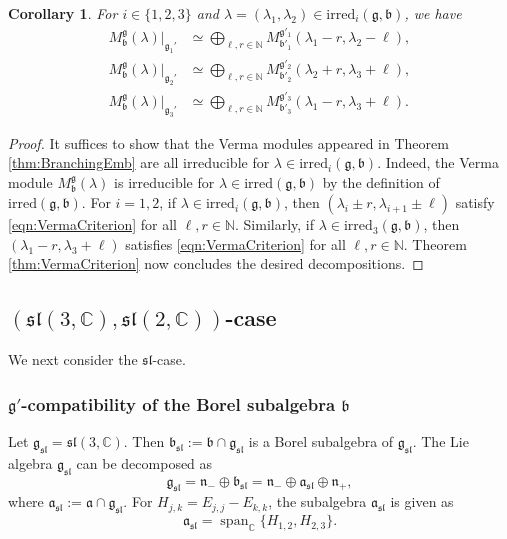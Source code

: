 \documentclass[a4paper,11pt,reqno]{amsart}
\newcommand{\fraka}{\mathfrak{a}}
\newcommand{\frakg}{\mathfrak{g}}
\newcommand{\frakn}{\mathfrak{n}}
\newcommand{\CC}{\mathbb{C}}
\newcommand{\0}{{\bf 0}}
\newcommand{\N}{\mathbb{N}}
\newcommand{\C}{\mathbb{C}}
\newcommand{\1}{{\bf 1}}
\DeclareMathOperator{\Span}{span}
\newcommand{\frakb}{{\mathfrak b}}
\newcommand{\irred}{\mathrm{irred}}
\newcommand{\fraksl}{{\mathfrak{sl}}}
\newcommand{\Mb}{M^{\frakg}_{\frakb}}
\theoremstyle{plain}
\newtheorem{corollary}[equation]{Corollary}
\theoremstyle{definition}
\numberwithin{equation}{section}
\theoremstyle{definition}
\begin{document}
\begin{corollary}\label{cor:BranchingEmb}
For $i \in \{1,2,3\}$ and 
$\lambda=(\lambda_1, \lambda_2) \in \irred_{i}(\frakg,\frakb)$,
we have
\begin{align*}
\Mb(\lambda)\vert_{\frakg_1'}
&\simeq 
\bigoplus_{\ell, r \in \N}
M^{\frakg'_1}_{\frakb'_1}(\lambda_1-r, \lambda_2-\ell),\\[3pt]
\Mb(\lambda)\vert_{\frakg_2'}
&\simeq 
\bigoplus_{\ell, r \in \N}
M^{\frakg'_2}_{\frakb'_2}(\lambda_2+r, \lambda_3+\ell),\\[3pt]
\Mb(\lambda)\vert_{\frakg_3'}
&\simeq 
\bigoplus_{\ell, r \in \N}
M^{\frakg'_3}_{\frakb'_3}(\lambda_1-r, \lambda_3+\ell).
\end{align*}
\end{corollary}

\begin{proof}
It suffices to show that the Verma modules appeared 
in Theorem \ref{thm:BranchingEmb}
are all irreducible for $\lambda \in \irred_{i}(\frakg,\frakb)$.
Indeed, the Verma module $\Mb(\lambda)$ is irreducible 
for  $\lambda \in \irred(\frakg,\frakb)$ by the definition of $\irred(\frakg,\frakb)$.
For $i=1,2$,
if $\lambda \in \irred_{i}(\frakg,\frakb)$, then 
$(\lambda_i\pm r, \lambda_{i+1}\pm \ell)$ 
satisfy \eqref{eqn:VermaCriterion} for all $\ell,r \in \N$.
Similarly, if $\lambda \in \irred_{3}(\frakg,\frakb)$, then 
$(\lambda_1-r,\lambda_3+\ell)$ satisfies \eqref{eqn:VermaCriterion}
for all $\ell, r\in \N$.
Theorem \ref{thm:VermaCriterion} now concludes the desired decompositions.
\end{proof}


\subsection{\texorpdfstring{$(\mathfrak{sl}(3,\C), \mathfrak{sl}(2,\C))$}{(gl(3,C),gl(2,C))}-case}
\label{sec:slsl}

We next consider the $\fraksl$-case.

\subsubsection{\texorpdfstring{$\frakg'$}{g}-compatibility of the Borel subalgebra \texorpdfstring{$\frakb$}{b}}
\label{sec:BorelSL}

Let $\frakg_{\fraksl}=\fraksl(3,\CC)$. Then $\frakb_{\mathfrak{sl}} := \frakb \cap \frakg_{\fraksl}$ is a Borel subalgebra of $\frakg_{\fraksl}$.
The Lie algebra $\frakg_{\fraksl}$ can be decomposed as
\begin{equation*}
\frakg_{\fraksl}
=\frakn_{-} \oplus \frakb_{\fraksl} 
= \frakn_{-} \oplus \fraka_{\fraksl} \oplus \frakn_{+},
\end{equation*}
where 
$\fraka_{\fraksl} :=\fraka \cap \frakg_{\fraksl}$.
For $H_{j,k}=E_{j,j}-E_{k,k}$, the subalgebra $\fraka_{\fraksl}$ is given as
\begin{equation*}
\fraka_{\fraksl}=\Span_\C\{H_{1,2}, H_{2,3}\}.
\end{equation*}
\end{document}
